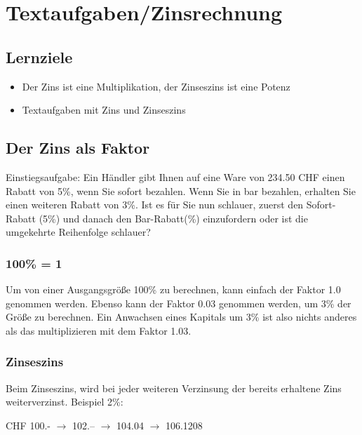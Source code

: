 
\newpage
\section{Textaufgaben/Zinsrechnung}
\subsection*{Lernziele}

\begin{itemize}
  \item Der Zins ist eine  Multiplikation, der Zinseszins ist eine Potenz
\item Textaufgaben mit Zins und Zinseszins
\end{itemize}

\subsection{Der Zins als Faktor}
Einstiegsaufgabe:
Ein Händler gibt Ihnen auf eine Ware von 234.50 CHF einen Rabatt von
5\%, wenn Sie sofort bezahlen. Wenn Sie in bar bezahlen, erhalten Sie
einen weiteren Rabatt von 3\%. Ist es für Sie nun schlauer, zuerst den
Sofort-Rabatt (5\%) und danach den Bar-Rabatt(\%) einzufordern oder
ist die umgekehrte Reihenfolge schlauer? 

\subsubsection{100\% = 1}
Um von einer Ausgangsgröße 100\% zu berechnen, kann einfach der Faktor
1.0 genommen werden. Ebenso kann der Faktor 0.03 genommen werden, um
3\% der Größe zu berechnen. Ein Anwachsen eines Kapitals um 3\% ist
also nichts anderes als das multiplizieren mit dem Faktor 1.03.

\subsubsection{Zinseszins}
Beim Zinseszins, wird bei jeder weiteren Verzinsung der bereits
erhaltene Zins weiterverzinst. Beispiel 2\%:

CHF 100.- $\rightarrow$ 102.-- $\rightarrow$ 104.04 $\rightarrow$
106.1208

